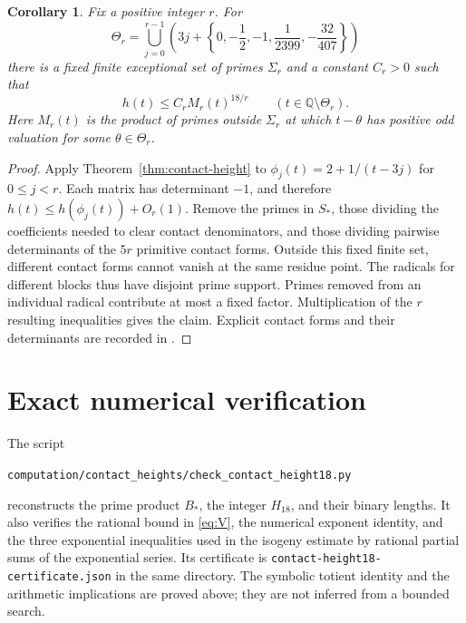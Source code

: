 \documentclass[11pt,a4paper]{article}
\newtheorem{corollary}[theorem]{Corollary}
\theoremstyle{definition}
\newcommand{\Q}{\mathbb Q}
\begin{document}
\begin{corollary}\label{cor:amplification}
Fix a positive integer $r$. For
\[
 \Theta_r=\bigcup_{j=0}^{r-1}
 \left(3j+\left\{0,-\frac12,-1,
                       \frac1{2399},-\frac{32}{407}\right\}\right)
\]
there is a fixed finite exceptional set of primes $\Sigma_r$
and a constant $C_r>0$ such that
\[
 h(t)\le C_r M_r(t)^{18/r}
 \qquad(t\in\Q\setminus\Theta_r).
\]
Here $M_r(t)$ is the product of primes outside $\Sigma_r$ at
which $t-\theta$ has positive odd valuation for some
$\theta\in\Theta_r$.
\end{corollary}
\begin{proof}
Apply Theorem~\ref{thm:contact-height} to
$\phi_j(t)=2+1/(t-3j)$ for $0\le j<r$.
Each matrix has determinant $-1$, and therefore
$h(t)\le h(\phi_j(t))+O_r(1)$.
Remove the primes in $S_*$, those dividing the coefficients
needed to clear contact denominators, and those dividing
pairwise determinants of the $5r$ primitive contact forms.
Outside this fixed finite set, different contact forms cannot
vanish at the same residue point. The radicals for different
blocks thus have disjoint prime support. Primes removed from
an individual radical contribute at most a fixed factor.
Multiplication of the $r$ resulting inequalities gives the claim.
Explicit contact forms and their determinants are recorded in
\cite[Sections~1--2]{Amplification}.
\end{proof}

\section{Exact numerical verification}

The script
\begin{center}\small
\nolinkurl{computation/contact_heights/check_contact_height18.py}
\end{center}
reconstructs the prime product $B_*$, the integer $H_{18}$,
and their binary lengths. It also verifies the rational bound
in \eqref{eq:V}, the numerical exponent identity, and the three
exponential inequalities used in the isogeny estimate by rational
partial sums of the exponential series. Its certificate is
\nolinkurl{contact-height18-certificate.json} in the same directory.
The symbolic totient identity and the arithmetic implications
are proved above; they are not inferred from a bounded search.
\end{document}
